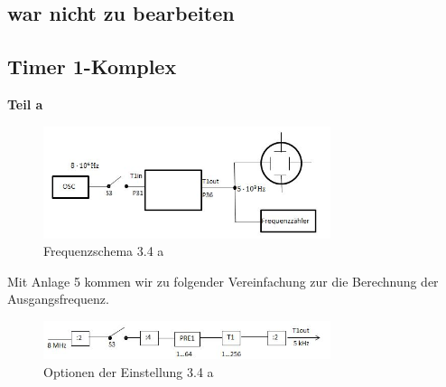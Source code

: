 \subsection{war nicht zu bearbeiten}


\subsection{Timer 1-Komplex}
\textbf{Teil a}
\begin{figure}[!ht]
\begin{center}
\includegraphics[width=0.75\textwidth]{34a1} 
\caption{Frequenzschema 3.4 a}
\label{341a}
\end{center}
\end{figure}

Mit Anlage 5 kommen wir zu folgender  Vereinfachung zur die Berechnung der Ausgangsfrequenz.


\begin{figure}[!ht]
\begin{center}
\includegraphics[width=0.75\textwidth]{34a2} 
\caption{Optionen der Einstellung 3.4 a}
\label{34a1}
\end{center}
\end{figure}


